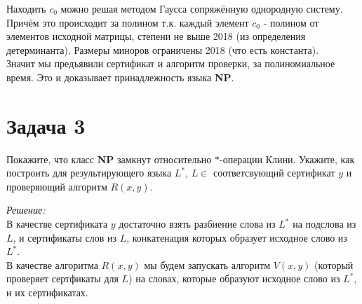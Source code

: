 \documentclass[12pt]{article}
\begin{document}
Находить $c_0$ можно решая методом Гаусса сопряжённую однородную систему. Причём это происходит за полином т.к. каждый элемент $c_0$ - полином от элементов исходной матрицы, степени не выше 2018 (из определения детерминанта). Размеры миноров ограничены 2018 (что есть константа). \\

Значит мы предъявили сертификат и алгоритм проверки, за полиномиальное время. Это и доказывает принадлежность языка \textbf{NP}.
\section* {Задача 3}
Покажите, что класс \textbf{NP} замкнут относительно $*$-операции Клини. Укажите, как построить для результирующего языка $L^*$, $L\in $  соответсвующий сертификат $y$ и проверяющий алгоритм $R(x,y)$.

{\itshape Решение:}
\\

В качестве сертификата $y$ достаточно взять разбиение слова из $L^*$ на подслова из $L$, и сертификаты слов из $L$, конкатенация которых образует исходное слово из $L^*$.
\\

В качестве алгоритма $R(x,y)$ мы будем запускать алгоритм $V(x,y)$ (который проверяет сертфикаты для $L$) на словах, которые образуют исходное слово из $L^*$, и их сертификатах.
\end{document}

